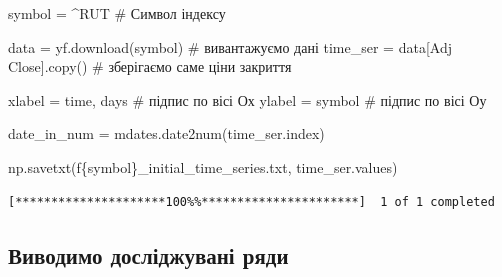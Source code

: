 \documentclass[
  letterpaper,
]{report}
\newenvironment{Shaded}{\begin{snugshade}}{\end{snugshade}}
\newcommand{\CommentTok}[1]{\textcolor[rgb]{0.37,0.37,0.37}{#1}}
\newcommand{\NormalTok}[1]{\textcolor[rgb]{0.00,0.23,0.31}{#1}}
\newcommand{\OperatorTok}[1]{\textcolor[rgb]{0.37,0.37,0.37}{#1}}
\newcommand{\SpecialCharTok}[1]{\textcolor[rgb]{0.37,0.37,0.37}{#1}}
\newcommand{\SpecialStringTok}[1]{\textcolor[rgb]{0.13,0.47,0.30}{#1}}
\newcommand{\StringTok}[1]{\textcolor[rgb]{0.13,0.47,0.30}{#1}}
\begin{document}
\begin{Shaded}
\begin{Highlighting}[]
\NormalTok{symbol }\OperatorTok{=} \StringTok{\textquotesingle{}\^{}RUT\textquotesingle{}}                       \CommentTok{\# Символ індексу}

\NormalTok{data }\OperatorTok{=}\NormalTok{ yf.download(symbol)            }\CommentTok{\# вивантажуємо дані}
\NormalTok{time\_ser }\OperatorTok{=}\NormalTok{ data[}\StringTok{\textquotesingle{}Adj Close\textquotesingle{}}\NormalTok{].copy()   }\CommentTok{\# зберігаємо саме ціни закриття}

\NormalTok{xlabel }\OperatorTok{=} \StringTok{\textquotesingle{}time, days\textquotesingle{}}                 \CommentTok{\# підпис по вісі Ох }
\NormalTok{ylabel }\OperatorTok{=}\NormalTok{ symbol                       }\CommentTok{\# підпис по вісі Оу}

\NormalTok{date\_in\_num }\OperatorTok{=}\NormalTok{ mdates.date2num(time\_ser.index)}

\NormalTok{np.savetxt(}\SpecialStringTok{f\textquotesingle{}}\SpecialCharTok{\{}\NormalTok{symbol}\SpecialCharTok{\}}\SpecialStringTok{\_initial\_time\_series.txt\textquotesingle{}}\NormalTok{, time\_ser.values)}
\end{Highlighting}
\end{Shaded}

\begin{verbatim}
[*********************100%%**********************]  1 of 1 completed
\end{verbatim}

\hypertarget{ux432ux438ux432ux43eux434ux438ux43cux43e-ux434ux43eux441ux43bux456ux434ux436ux443ux432ux430ux43dux456-ux440ux44fux434ux438}{%
\subsection{Виводимо досліджувані
ряди}\label{ux432ux438ux432ux43eux434ux438ux43cux43e-ux434ux43eux441ux43bux456ux434ux436ux443ux432ux430ux43dux456-ux440ux44fux434ux438}}
\end{document}
